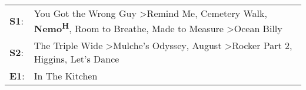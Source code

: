 \begin{supertabular}{p{0.03\textwidth}p{0.92\textwidth}}
 \textbf{S1}:  &  You Got the Wrong Guy\textsuperscript{} \textgreater \enspace Remind Me\textsuperscript{}, \enspace Cemetery Walk\textsuperscript{}, \enspace \textbf{Nemo\textsuperscript{H}}, \enspace Room to Breathe\textsuperscript{}, \enspace Made to Measure\textsuperscript{} \textgreater \enspace Ocean Billy\textsuperscript{}  \enspace  \\
 \textbf{S2}:  &                                                             The Triple Wide\textsuperscript{} \textgreater \enspace Mulche's Odyssey\textsuperscript{}, \enspace August\textsuperscript{} \textgreater \enspace Rocker Part 2\textsuperscript{}, \enspace Higgins\textsuperscript{}, \enspace Let's Dance\textsuperscript{}  \enspace  \\
 \textbf{E1}:  &                                                                                                                                                                                                                                                                                            In The Kitchen\textsuperscript{}  \enspace  \\
\end{supertabular}
